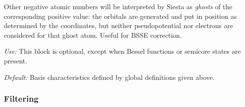 \documentclass[11pt]{article}
\begin{document}
\begin{description}
Other negative atomic numbers will be interpreted by {\sc Siesta} as 
{\it ghosts} 
of the corresponding positive value: the orbitals
are generated and put in position as determined by the coordinates,
but neither pseudopotential nor electrons are considered for that
ghost atom. Useful for BSSE correction.

{\it Use:} This block is optional, except when Bessel functions or
semicore states are present. 

{\it Default:} Basis characteristics defined by global definitions given
above.

\end{description}

\subsubsection{Filtering}
\label{sec:filtering}
\end{document}

